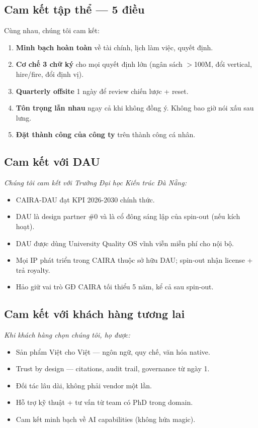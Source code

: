 \documentclass[11pt,a4paper]{article}
\begin{document}
\subsection{Cam kết tập thể --- 5 điều}

Cùng nhau, chúng tôi cam kết:

\begin{enumerate}
\item \textbf{Minh bạch hoàn toàn} về tài chính, lịch làm việc, quyết định.
\item \textbf{Cơ chế 3 chữ ký} cho mọi quyết định lớn (ngân sách $>$100M, đổi vertical, hire/fire, đổi định vị).
\item \textbf{Quarterly offsite} 1 ngày để review chiến lược + reset.
\item \textbf{Tôn trọng lẫn nhau} ngay cả khi không đồng ý. Không bao giờ nói xấu sau lưng.
\item \textbf{Đặt thành công của công ty} trên thành công cá nhân.
\end{enumerate}

\subsection{Cam kết với DAU}

\begin{quotebox}
\textit{Chúng tôi cam kết với Trường Đại học Kiến trúc Đà Nẵng:}
\begin{itemize}
\item CAIRA-DAU đạt KPI 2026-2030 chính thức.
\item DAU là design partner \#0 và là cổ đông sáng lập của spin-out (nếu kích hoạt).
\item DAU được dùng University Quality OS vĩnh viễn miễn phí cho nội bộ.
\item Mọi IP phát triển trong CAIRA thuộc sở hữu DAU; spin-out nhận license + trả royalty.
\item Hảo giữ vai trò GĐ CAIRA tối thiểu 5 năm, kể cả sau spin-out.
\end{itemize}
\end{quotebox}

\subsection{Cam kết với khách hàng tương lai}

\begin{quotebox}
\textit{Khi khách hàng chọn chúng tôi, họ được:}
\begin{itemize}
\item Sản phẩm Việt cho Việt --- ngôn ngữ, quy chế, văn hóa native.
\item Trust by design --- citations, audit trail, governance từ ngày 1.
\item Đối tác lâu dài, không phải vendor một lần.
\item Hỗ trợ kỹ thuật + tư vấn từ team có PhD trong domain.
\item Cam kết minh bạch về AI capabilities (không hứa magic).
\end{itemize}
\end{quotebox}
\end{document}
